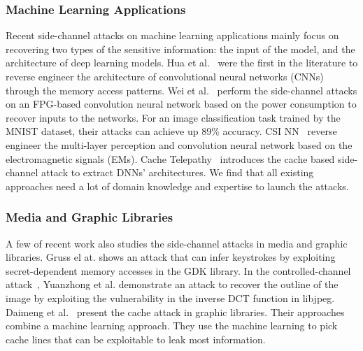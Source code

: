 \subsubsection{Machine Learning Applications}
Recent side-channel attacks on machine learning applications mainly focus on recovering two types of the sensitive information: the input of the model, and the architecture of deep learning models. Hua et al.~\cite{hua2018reverse} were the first in the literature to reverse engineer the architecture of convolutional neural networks (CNNs) through the memory access patterns. Wei et al.~\cite{wei2018know} perform the side-channel attacks on an FPG-based convolution neural network based on the power consumption to recover inputs to the networks. For an image classification task trained by the MNIST dataset, their attacks can achieve up 89\% accuracy. CSI NN~\cite{batina2019csi} reverse engineer the multi-layer perception and convolution neural network based on the electromagnetic signals (EMs). Cache Telepathy~\cite{yan2020cache} introduces the cache based side-channel attack to extract DNNs' architectures. We find that all existing approaches need a lot of domain knowledge and expertise to launch the attacks.
\subsubsection{Media and Graphic Libraries}
A few of recent work also studies the side-channel attacks in media and graphic libraries. Gruss el at. shows an attack that can infer keystrokes by exploiting secret-dependent memory accesses in the GDK library. In the controlled-channel attack~\cite{xu2015controlled}, Yuanzhong et al. demonstrate an attack to recover the outline of the image by exploiting the vulnerability in the inverse DCT function in libjpeg. Daimeng et al.~\cite{wang2019unveiling} present the cache attack in graphic libraries. Their approaches combine a machine learning approach. They use the machine learning to pick cache lines that can be exploitable to leak most information.
